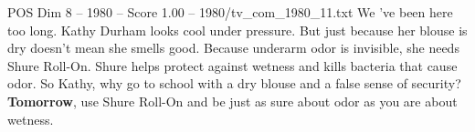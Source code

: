 \begin{textsample}{POS Dim 8 – 1980 – Score 1.00 – 1980/tv\_com\_1980\_11.txt}  \label{ex:f8_pos_049}
We 've been here too long.
Kathy Durham looks cool under pressure.
But just because her blouse is dry doesn't mean she smells good.
Because underarm odor is invisible, she needs Shure Roll-On.
Shure helps protect against wetness and kills bacteria that cause odor.
So Kathy, why go to school with a dry blouse and a false sense of security? \textbf{Tomorrow}, use Shure Roll-On and be just as sure about odor as you are about wetness.

\end{textsample}
